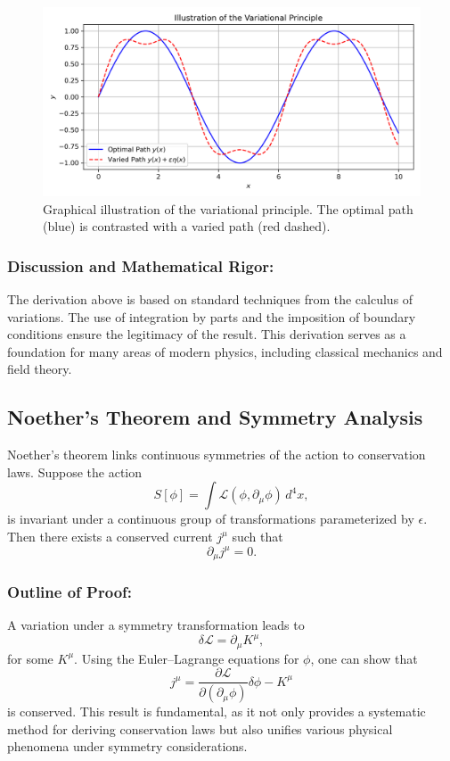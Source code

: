 \documentclass[11pt,a4paper]{article}
\begin{document}
\begin{figure}[ht]
    \centering
    \includegraphics[width=0.8\linewidth]{fig_variational.png}
    \caption{Graphical illustration of the variational principle. The optimal path (blue) is contrasted with a varied path (red dashed).}
    \label{fig:variational}
\end{figure}

\subsubsection*{Discussion and Mathematical Rigor:}
The derivation above is based on standard techniques from the calculus of variations. The use of integration by parts and the imposition of boundary conditions ensure the legitimacy of the result. This derivation serves as a foundation for many areas of modern physics, including classical mechanics and field theory.

\subsection{Noether’s Theorem and Symmetry Analysis}

Noether’s theorem links continuous symmetries of the action to conservation laws. Suppose the action
\[
S[\phi] = \int \mathcal{L}(\phi, \partial_\mu \phi)\, d^4x,
\]
is invariant under a continuous group of transformations parameterized by \(\epsilon\). Then there exists a conserved current \(j^\mu\) such that
\[
\partial_\mu j^\mu = 0.
\]

\subsubsection*{Outline of Proof:}
A variation under a symmetry transformation leads to
\[
\delta \mathcal{L} = \partial_\mu K^\mu,
\]
for some \(K^\mu\). Using the Euler--Lagrange equations for \(\phi\), one can show that
\[
j^\mu = \frac{\partial \mathcal{L}}{\partial (\partial_\mu \phi)} \delta \phi - K^\mu
\]
is conserved. This result is fundamental, as it not only provides a systematic method for deriving conservation laws but also unifies various physical phenomena under symmetry considerations.
\end{document}

